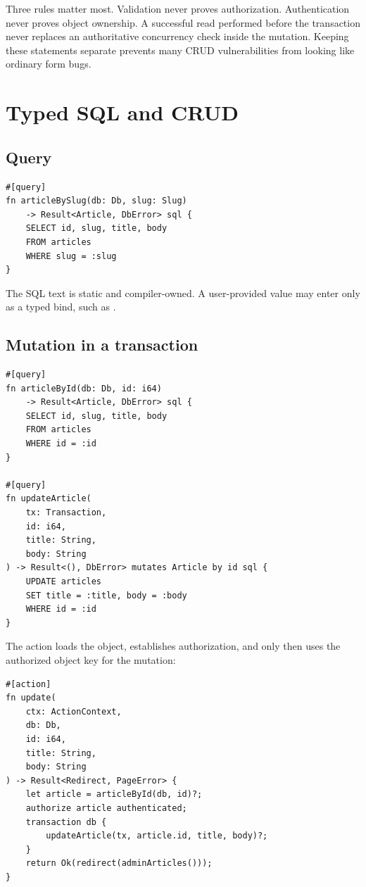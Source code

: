 Three rules matter most. Validation never proves authorization. Authentication never proves object ownership. A successful read performed before the transaction never replaces an authoritative concurrency check inside the mutation. Keeping these statements separate prevents many CRUD vulnerabilities from looking like ordinary form bugs.

\section{Typed SQL and CRUD}

\subsection*{Query}

\begin{lstlisting}[language=Velran]
#[query]
fn articleBySlug(db: Db, slug: Slug)
    -> Result<Article, DbError> sql {
    SELECT id, slug, title, body
    FROM articles
    WHERE slug = :slug
}
\end{lstlisting}

The SQL text is static and compiler-owned. A user-provided value may enter only as a typed bind, such as .

\subsection*{Mutation in a transaction}

\begin{lstlisting}[language=Velran]
#[query]
fn articleById(db: Db, id: i64)
    -> Result<Article, DbError> sql {
    SELECT id, slug, title, body
    FROM articles
    WHERE id = :id
}

#[query]
fn updateArticle(
    tx: Transaction,
    id: i64,
    title: String,
    body: String
) -> Result<(), DbError> mutates Article by id sql {
    UPDATE articles
    SET title = :title, body = :body
    WHERE id = :id
}
\end{lstlisting}

The action loads the object, establishes authorization, and only then uses the authorized object key for the mutation:

\begin{lstlisting}[language=Velran]
#[action]
fn update(
    ctx: ActionContext,
    db: Db,
    id: i64,
    title: String,
    body: String
) -> Result<Redirect, PageError> {
    let article = articleById(db, id)?;
    authorize article authenticated;
    transaction db {
        updateArticle(tx, article.id, title, body)?;
    }
    return Ok(redirect(adminArticles()));
}
\end{lstlisting}

